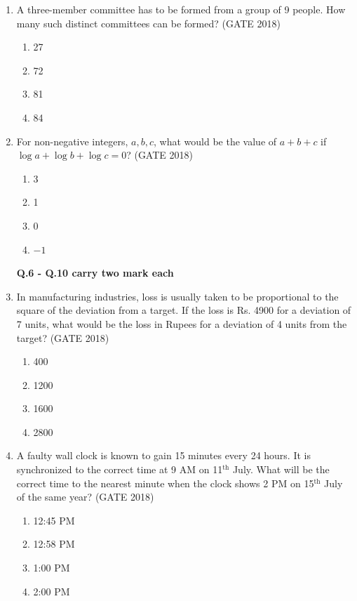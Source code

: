 \documentclass[journal,12pt,onecolumn]{IEEEtran}
\theoremstyle{remark}
\begin{document}
\begin{enumerate}
\item A three-member committee has to be formed from a group of 9 people. How many such distinct committees can be formed?
\hfill{(GATE 2018)}
\begin{multicols}{4}
\begin{enumerate}
    \item 27
    \item 72
    \item 81
    \item 84
\end{enumerate}
\end{multicols}
\vspace{1cm}

\item For non-negative integers, $a, b, c$, what would be the value of $a+b+c$ if\\
$\log a + \log b + \log c = 0$?
\hfill{(GATE 2018)}
\begin{multicols}{4}
\begin{enumerate}
    \item 3
    \item 1
    \item 0
    \item $-1$
\end{enumerate}
\end{multicols}
\vspace{1cm}

\textbf{\large Q.6 - Q.10 carry two mark each}
\vspace{1cm}
\item In manufacturing industries, loss is usually taken to be proportional to the square of the deviation from a target. If the loss is Rs. 4900 for a deviation of 7 units, what would be the loss in Rupees for a deviation of 4 units from the target?
\hfill{(GATE 2018)}
\begin{multicols}{4}
\begin{enumerate}
    \item 400
    \item 1200
    \item 1600
    \item 2800
\end{enumerate}
\end{multicols}
\vspace{1cm}

\item A faulty wall clock is known to gain 15 minutes every 24 hours. It is synchronized to the correct time at 9 AM on 11$^{\text{th}}$ July. What will be the correct time to the nearest minute when the clock shows 2 PM on 15$^{\text{th}}$ July of the same year?
\hfill{(GATE 2018)}
\begin{multicols}{4}
\begin{enumerate}
    \item 12:45 PM
    \item 12:58 PM
    \item 1:00 PM
    \item 2:00 PM
\end{enumerate}
\end{multicols}
\vspace{1cm}


\end{enumerate}
\end{document}
